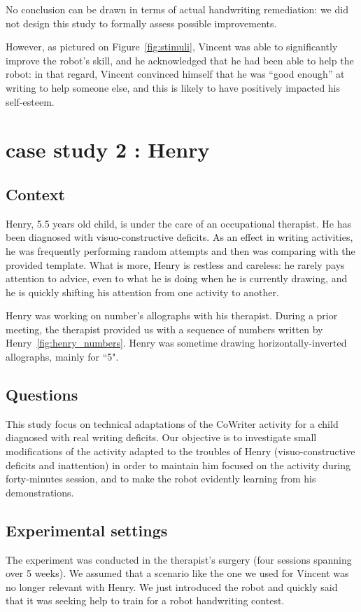 \documentclass{sig-alternate}
\begin{document}
No conclusion can be drawn in terms of actual handwriting remediation: we did
not design this study to formally assess possible improvements.

However, as pictured on Figure~\ref{fig:stimuli}, Vincent was able to
significantly improve the robot's skill, and he acknowledged that he had been
able to help the robot: in that regard, Vincent convinced himself that he was
``good enough'' at writing to help someone else, and this is likely to have
positively impacted his self-esteem.



\section{case study 2 : Henry}

\subsection{Context}

Henry, 5.5 years old child, is under the care of an occupational
therapist. He has been diagnosed with visuo-constructive deficits.
As an effect in writing activities, he was frequently performing random attempts and then was comparing
with the provided template. What is more, Henry is restless and careless: he
rarely pays attention to
advice, even to what he is doing when he is currently drawing, and he is
quickly shifting his attention from one activity to another.

Henry was working on number's allographs with his therapist. During a prior
meeting, the therapist provided us with a sequence of numbers
written by Henry~\ref{fig:henry_numbers}. Henry was sometime drawing
horizontally-inverted allographs, mainly for ``5".

\subsection{Questions}
This study focus on technical adaptations of the CoWriter activity for a 
child diagnosed with real writing deficits.
Our objective is to investigate small modifications of the activity adapted to
the troubles of Henry (visuo-constructive deficits and inattention) in order to
maintain him focused
on the activity during forty-minutes session, and to make the robot
evidently learning from his demonstrations.

\subsection{Experimental settings}
The experiment was conducted in the therapist's surgery  (four sessions 
spanning over 5 weeks). We assumed that a scenario like the one we used 
for Vincent was no longer relevant with Henry. We just introduced the robot 
and quickly said that it was seeking help to train for a robot handwriting contest.
\end{document}
